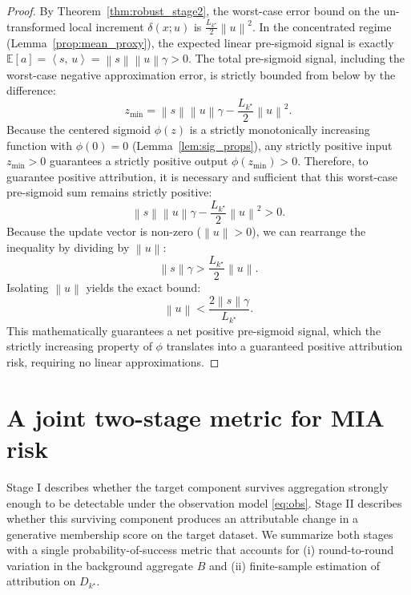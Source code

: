 \documentclass{article}
\theoremstyle{plain}
\theoremstyle{definition}
\theoremstyle{remark}
\numberwithin{theorem}{section}
\numberwithin{definition}{section}
\numberwithin{remark}{section}
\numberwithin{lemma}{section}
\numberwithin{assumption}{section}
\newcommand{\ip}[2]{\left\langle #1,\,#2 \right\rangle}
\newcommand{\norm}[1]{\left\lVert #1 \right\rVert}
\newcommand{\E}{\mathbb{E}}
\newcommand{\tindex}{k^\star}
\newcommand{\utarget}{u}
\begin{document}
\begin{proof}
By Theorem~\ref{thm:robust_stage2}, the worst-case error bound on the un-transformed local increment $\delta(x; u)$ is $\frac{L_{\tindex}}{2}\norm{\utarget}^2$. 
In the concentrated regime (Lemma~\ref{prop:mean_proxy}), the expected linear pre-sigmoid signal is exactly $\E[a] = \ip{s}{\utarget} = \norm{s}\norm{\utarget}\gamma > 0$.
The total pre-sigmoid signal, including the worst-case negative approximation error, is strictly bounded from below by the difference:
\[
z_{\text{min}} = \norm{s}\norm{\utarget}\gamma - \frac{L_{\tindex}}{2}\norm{\utarget}^2.
\]
Because the centered sigmoid $\phi(z)$ is a strictly monotonically increasing function with $\phi(0) = 0$ (Lemma~\ref{lem:sig_props}), any strictly positive input $z_{\text{min}} > 0$ guarantees a strictly positive output $\phi(z_{\text{min}}) > 0$.
Therefore, to guarantee positive attribution, it is necessary and sufficient that this worst-case pre-sigmoid sum remains strictly positive:
\[
\norm{s}\norm{\utarget}\gamma - \frac{L_{\tindex}}{2}\norm{\utarget}^2 > 0.
\]
Because the update vector is non-zero ($\norm{\utarget} > 0$), we can rearrange the inequality by dividing by $\norm{\utarget}$:
\[
\norm{s}\gamma > \frac{L_{\tindex}}{2}\norm{\utarget}.
\]
Isolating $\norm{\utarget}$ yields the exact bound:
\[
\norm{\utarget} < \frac{2\norm{s}\gamma}{L_{\tindex}}.
\]
This mathematically guarantees a net positive pre-sigmoid signal, which the strictly increasing property of $\phi$ translates into a guaranteed positive attribution risk, requiring no linear approximations.
\end{proof}

\section{A joint two-stage metric for MIA risk}
\label{sec:two_stage_metric}

Stage I describes whether the target component survives aggregation strongly enough to be detectable under the observation model \eqref{eq:obs}.
Stage II describes whether this surviving component produces an attributable change in a generative membership score on the target dataset.
We summarize both stages with a single probability-of-success metric that accounts for (i) round-to-round variation in the background aggregate $B$
and (ii) finite-sample estimation of attribution on $D_{\tindex}$.
\end{document}
